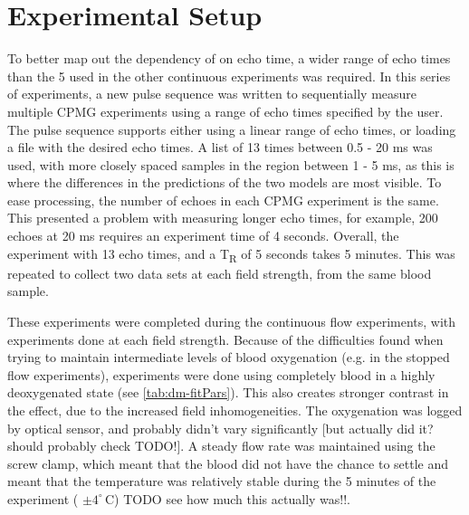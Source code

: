 \section{Experimental Setup}
To better map out the dependency of \Ttwo on echo time, a wider range of echo times than the 5 used in the other continuous experiments was required.
In this series of experiments, a new pulse sequence  was written to sequentially measure multiple CPMG experiments using a range of echo times specified by the user.
The pulse sequence supports either using a linear range of echo times, or loading a file with the desired echo times.
A list of 13 times between 0.5 - 20 ms was used, with more closely spaced samples in the region between 1 - 5 ms, as this is where the differences in the predictions of the two models are most visible.
To ease processing, the number of echoes in each CPMG experiment is the same.
This presented a problem with measuring longer echo times, for example, 200 echoes at 20 ms requires an experiment time of 4 seconds.
Overall, the experiment with 13 echo times, and a T\textsubscript{R} of 5 seconds takes 5 minutes.
This was repeated to collect two data sets at each field strength, from the same blood sample.

These experiments were completed during the continuous flow experiments, with experiments done at each field strength.
Because of the difficulties found when trying to maintain intermediate levels of blood oxygenation (e.g. in the stopped flow experiments), experiments were done using completely blood in a highly deoxygenated state (see \autoref{tab:dm-fitPars}).
This also creates stronger contrast in the \Ttwo effect, due to the increased field inhomogeneities.
The oxygenation was logged by optical sensor, and probably didn't vary significantly [but actually did it? should probably check TODO!].
A steady flow rate was maintained using the screw clamp, which meant that the blood did not have the chance to settle and meant that the temperature was relatively stable during the 5 minutes of the experiment ( \mbox{$\pm 4^{\circ}\, \mathrm{C}$}) TODO see how much this actually was!!.

